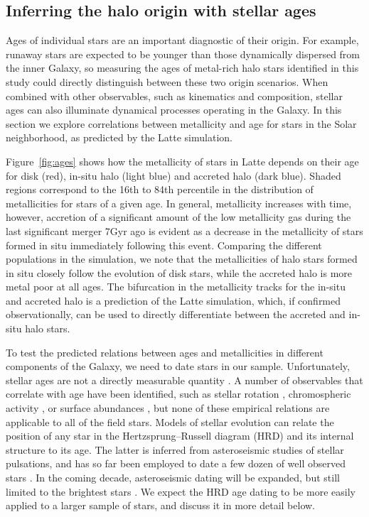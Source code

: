 \documentclass[apj, twocolappendix, numberedappendix, appendixfloats]{emulateapj}
\begin{document}
\subsection{Inferring the halo origin with stellar ages}
\label{sec:ages}
Ages of individual stars are an important diagnostic of their origin.
For example, runaway stars are expected to be younger than those dynamically dispersed from the inner Galaxy, so measuring the ages of metal-rich halo stars identified in this study could directly distinguish between these two origin scenarios.
When combined with other observables, such as kinematics and composition, stellar ages can also illuminate dynamical processes operating in the Galaxy.
In this section we explore correlations between metallicity and age for stars in the Solar neighborhood, as predicted by the Latte simulation.

Figure~\ref{fig:ages} shows how the metallicity of stars in Latte depends on their age for disk (red), in-situ halo (light blue) and accreted halo (dark blue).
Shaded regions correspond to the 16th to 84th percentile in the distribution of metallicities for stars of a given age.
In general, metallicity increases with time, however, accretion of a significant amount of the low metallicity gas during the last significant merger 7\;Gyr ago is evident as a decrease in the metallicity of stars formed in situ immediately following this event.
Comparing the different populations in the simulation, we note that the metallicities of halo stars formed in situ closely follow the evolution of disk stars, while the accreted halo is more metal poor at all ages.
The bifurcation in the metallicity tracks for the in-situ and accreted halo is a prediction of the Latte simulation, which, if confirmed observationally, can be used to directly differentiate between the accreted and in-situ halo stars.

To test the predicted relations between ages and metallicities in different components of the Galaxy, we need to date stars in our sample.
Unfortunately, stellar ages are not a directly measurable quantity \citep[for a recent review, see][]{soderblom2010}.
A number of observables that correlate with age have been identified, such as stellar rotation \citep{barnes2007}, chromospheric activity \citep{mamajek2008}, or surface abundances \citep{ness2016}, but none of these empirical relations are applicable to all of the field stars.
Models of stellar evolution can relate the position of any star in the Hertzsprung--Russell diagram (HRD) and its internal structure to its age.
The latter is inferred from asteroseismic studies of stellar pulsations, and has so far been employed to date a few dozen of well observed stars \citep[e.g.,][]{keplerages}.
In the coming decade, asteroseismic dating will be expanded, but still limited to the brightest stars \citep{tess, plato}.
We expect the HRD age dating to be more easily applied to a larger sample of stars, and discuss it in more detail below.
\end{document}
